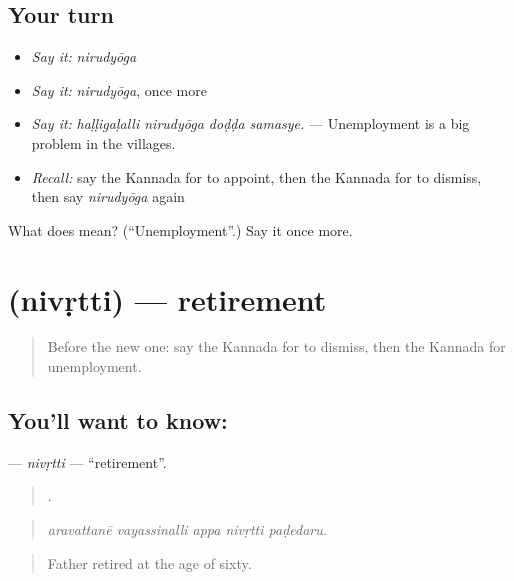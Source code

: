 \subsection*{Your turn}
\begin{itemize}
\raggedright
  \item \emph{Say it:} \emph{nirudyōga}
  \item \emph{Say it:} \emph{nirudyōga}, once more
  \item \emph{Say it:} \emph{haḷḷigaḷalli nirudyōga doḍḍa samasye.} — Unemployment is a big problem in the villages.
  \item \emph{Recall:} say the Kannada for to appoint, then the Kannada for to dismiss, then say \emph{nirudyōga} again
\end{itemize}

\begin{tcolorbox}[breakable,colback=teal!4,colframe=teal!35!black,title={Before you move on}]
What does  mean? (\textquotedblleft{}Unemployment\textquotedblright{}.) Say it once more.
\end{tcolorbox}
\section[\texorpdfstring{\kn{ನಿವೃತ್ತಿ} (nivṛtti)}{ನಿವೃತ್ತಿ (nivṛtti)}]{ (nivṛtti) — retirement}

\label{lesson:KA-C518-nivrtti}



\begin{quote}
Before the new one: say the Kannada for to dismiss, then the Kannada for unemployment.
\end{quote}

\subsection*{You'll want to know: }
\textbf{} — \emph{nivṛtti} — \textquotedblleft{}retirement\textquotedblright{}.

\begin{quote}
    .
\end{quote}

\begin{quote}
\emph{aravattanē vayassinalli appa nivṛtti paḍedaru.}
\end{quote}

\begin{quote}
Father retired at the age of sixty.
\end{quote}

